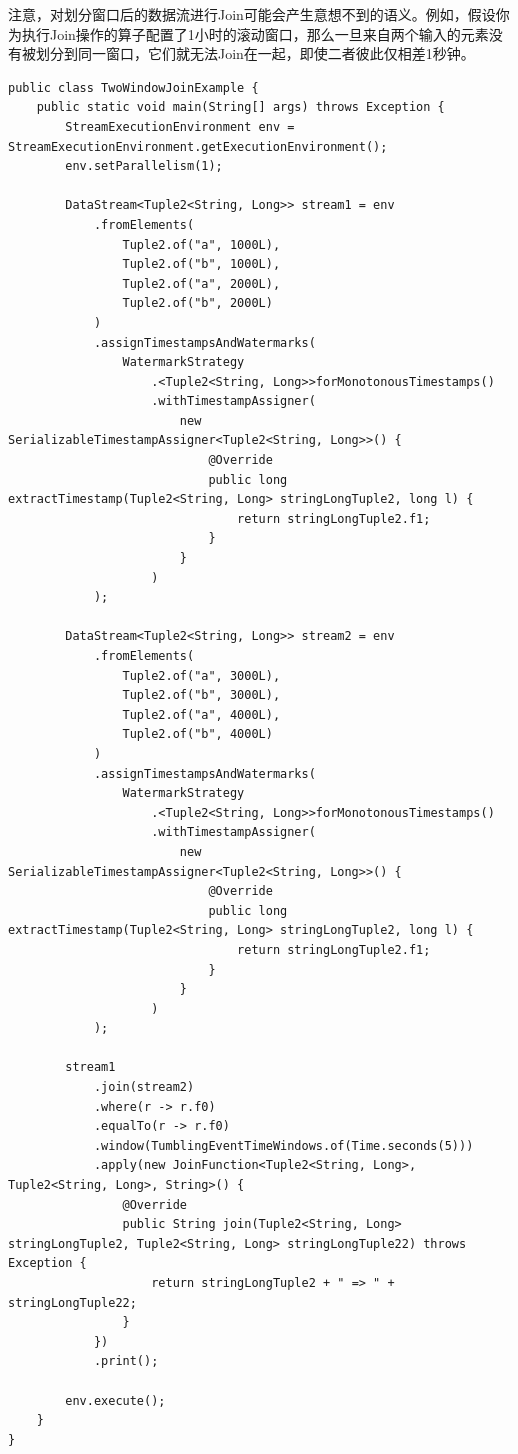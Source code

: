 \documentclass[cn,11pt,chinese]{elegantbook}
\begin{document}
\begin{note}
    注意，对划分窗口后的数据流进行Join可能会产生意想不到的语义。例如，假设你为执行Join操作的算子配置了1小时的滚动窗口，那么一旦来自两个输入的元素没有被划分到同一窗口，它们就无法Join在一起，即使二者彼此仅相差1秒钟。
\end{note}

\begin{verbatim}
public class TwoWindowJoinExample {
    public static void main(String[] args) throws Exception {
        StreamExecutionEnvironment env = StreamExecutionEnvironment.getExecutionEnvironment();
        env.setParallelism(1);

        DataStream<Tuple2<String, Long>> stream1 = env
            .fromElements(
                Tuple2.of("a", 1000L),
                Tuple2.of("b", 1000L),
                Tuple2.of("a", 2000L),
                Tuple2.of("b", 2000L)
            )
            .assignTimestampsAndWatermarks(
                WatermarkStrategy
                    .<Tuple2<String, Long>>forMonotonousTimestamps()
                    .withTimestampAssigner(
                        new SerializableTimestampAssigner<Tuple2<String, Long>>() {
                            @Override
                            public long extractTimestamp(Tuple2<String, Long> stringLongTuple2, long l) {
                                return stringLongTuple2.f1;
                            }
                        }
                    )
            );

        DataStream<Tuple2<String, Long>> stream2 = env
            .fromElements(
                Tuple2.of("a", 3000L),
                Tuple2.of("b", 3000L),
                Tuple2.of("a", 4000L),
                Tuple2.of("b", 4000L)
            )
            .assignTimestampsAndWatermarks(
                WatermarkStrategy
                    .<Tuple2<String, Long>>forMonotonousTimestamps()
                    .withTimestampAssigner(
                        new SerializableTimestampAssigner<Tuple2<String, Long>>() {
                            @Override
                            public long extractTimestamp(Tuple2<String, Long> stringLongTuple2, long l) {
                                return stringLongTuple2.f1;
                            }
                        }
                    )
            );

        stream1
            .join(stream2)
            .where(r -> r.f0)
            .equalTo(r -> r.f0)
            .window(TumblingEventTimeWindows.of(Time.seconds(5)))
            .apply(new JoinFunction<Tuple2<String, Long>, Tuple2<String, Long>, String>() {
                @Override
                public String join(Tuple2<String, Long> stringLongTuple2, Tuple2<String, Long> stringLongTuple22) throws Exception {
                    return stringLongTuple2 + " => " + stringLongTuple22;
                }
            })
            .print();

        env.execute();
    }
}
\end{verbatim}
\end{document}
